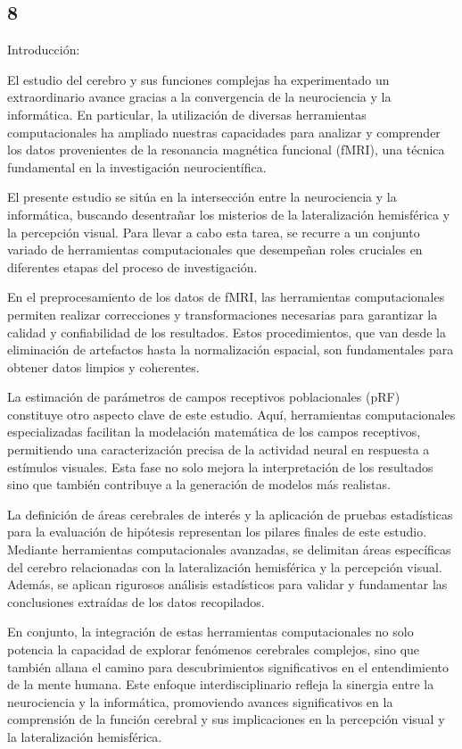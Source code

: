 \documentclass[12pt,oneside]{uhthesis}
\begin{document}
\subsection{8}

Introducción:

El estudio del cerebro y sus funciones complejas ha experimentado un extraordinario avance gracias a la convergencia de la neurociencia y la informática. En particular, la utilización de diversas herramientas computacionales ha ampliado nuestras capacidades para analizar y comprender los datos provenientes de la resonancia magnética funcional (fMRI), una técnica fundamental en la investigación neurocientífica.

El presente estudio se sitúa en la intersección entre la neurociencia y la informática, buscando desentrañar los misterios de la lateralización hemisférica y la percepción visual. Para llevar a cabo esta tarea, se recurre a un conjunto variado de herramientas computacionales que desempeñan roles cruciales en diferentes etapas del proceso de investigación.

En el preprocesamiento de los datos de fMRI, las herramientas computacionales permiten realizar correcciones y transformaciones necesarias para garantizar la calidad y confiabilidad de los resultados. Estos procedimientos, que van desde la eliminación de artefactos hasta la normalización espacial, son fundamentales para obtener datos limpios y coherentes.

La estimación de parámetros de campos receptivos poblacionales (pRF) constituye otro aspecto clave de este estudio. Aquí, herramientas computacionales especializadas facilitan la modelación matemática de los campos receptivos, permitiendo una caracterización precisa de la actividad neural en respuesta a estímulos visuales. Esta fase no solo mejora la interpretación de los resultados sino que también contribuye a la generación de modelos más realistas.

La definición de áreas cerebrales de interés y la aplicación de pruebas estadísticas para la evaluación de hipótesis representan los pilares finales de este estudio. Mediante herramientas computacionales avanzadas, se delimitan áreas específicas del cerebro relacionadas con la lateralización hemisférica y la percepción visual. Además, se aplican rigurosos análisis estadísticos para validar y fundamentar las conclusiones extraídas de los datos recopilados.

En conjunto, la integración de estas herramientas computacionales no solo potencia la capacidad de explorar fenómenos cerebrales complejos, sino que también allana el camino para descubrimientos significativos en el entendimiento de la mente humana. Este enfoque interdisciplinario refleja la sinergia entre la neurociencia y la informática, promoviendo avances significativos en la comprensión de la función cerebral y sus implicaciones en la percepción visual y la lateralización hemisférica.
\end{document}
